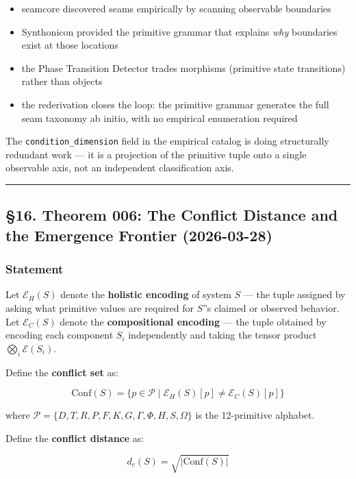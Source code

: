 \documentclass[12pt,a4paper]{article}
\newcommand{\pilcrow}{\S}
\begin{document}
\begin{itemize}
    \item seamcore discovered seams empirically by scanning observable boundaries
    \item Synthonicon provided the primitive grammar that explains \emph{why} boundaries exist at those locations
    \item the Phase Transition Detector trades morphisms (primitive state transitions) rather than objects
    \item the rederivation closes the loop: the primitive grammar generates the full seam taxonomy ab initio, with no empirical enumeration required
\end{itemize}

The \texttt{condition\_dimension} field in the empirical catalog is doing structurally redundant work --- it is a projection of the primitive tuple onto a single observable axis, not an independent classification axis.

\begin{center}
\rule{0.5\textwidth}{0.4pt}
\end{center}

\subsection{\pilcrow{}16. Theorem 006: The Conflict Distance and the Emergence Frontier (2026-03-28)}

\subsubsection{Statement}

Let $\mathcal{E}_H(S)$ denote the \textbf{holistic encoding} of system $S$ --- the tuple assigned by asking what primitive values are required for $S$''s claimed or observed behavior. Let $\mathcal{E}_C(S)$ denote the \textbf{compositional encoding} --- the tuple obtained by encoding each component $S_i$ independently and taking the tensor product $\bigotimes_i \mathcal{E}(S_i)$.

Define the \textbf{conflict set} as:

\[\text{Conf}(S) = \{ p \in \mathcal{P} \mid \mathcal{E}_H(S)[p] \neq \mathcal{E}_C(S)[p] \}\]

where $\mathcal{P} = \{D, T, R, P, F, K, G, \Gamma, \Phi, H, S, \Omega\}$ is the 12-primitive alphabet.

Define the \textbf{conflict distance} as:

\[d_c(S) = \sqrt{|\text{Conf}(S)|}\]
\end{document}
